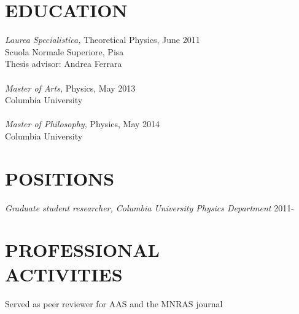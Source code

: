 \documentclass[margin]{res} %
\begin{document}
\begin{resume}


\section{EDUCATION}

{\sl Laurea Specialistica,} Theoretical Physics, June 2011 \\
Scuola Normale Superiore, Pisa \\ 
Thesis advisor: Andrea Ferrara \\ \\ 
{\sl Master of Arts,} Physics, May 2013 \\ 
Columbia University \\ \\ 
{\sl Master of Philosophy,} Physics, May 2014 \\ 
Columbia University
 
 
\section{POSITIONS}

{\sl Graduate student researcher, Columbia University Physics Department} \hfill 2011- \\


\section{PROFESSIONAL \\ ACTIVITIES} 

Served as peer reviewer for AAS and the MNRAS journal


\end{resume}
\end{document}
